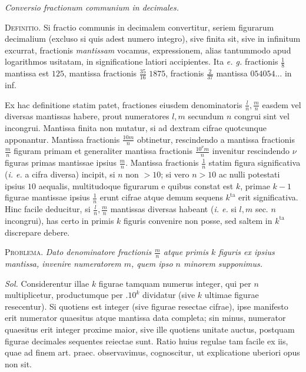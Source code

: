 \begin{center}\textit{Conversio fractionum communium in decimales.}\end{center}

\textsc{Definitio.} Si fractio communis in decimalem convertitur, seriem figurarum decimalium  (excluso si quis adest numero integro), sive finita sit, sive in infinitum excurrat, fractionis \textit{mantissam} vocamus, expressionem, alias tantummodo apud logarithmos usitatam, in significatione latiori accipientes. Ita \textit{e. g.} fractionis \(\frac18\) mantissa est \(125\), mantissa fractionis \(\frac{35}{16}\) \(1875\), fractionis \(\frac2{37}\) mantissa \(054054\ldots\) in inf.

Ex hac definitione statim patet, fractiones eiusdem denominatoris \(\frac ln,\frac mn\) easdem vel diversas mantissas habere, prout numeratores \(l,m\) secundum \(n\) congrui sint vel incongrui. Mantissa finita non mutatur, si ad dextram cifrae quotcunque apponantur. Mantissa fractionis \(\frac{10m}{n}\) obtinetur, rescindendo a mantissa fractionis \(\frac mn\) figuram primam et generaliter mantissa fractionis \(\frac{10^\nu m}{n}\) invenitur rescindendo \(\nu\) figuras primas mantissae ipsius \(\frac mn\). Mantissa fractionis \(\frac1n\) statim figura significativa (\textit{i. e.} a cifra diversa) incipit, si \(n\) non \(>10\); si vero \(n>10\) ac nulli potestati ipsius \(10\) aequalis, multitudoque figurarum e quibus constat est \(k\), primae \(k-1\) figurae mantissae ipsius \(\frac1n\) erunt cifrae atque demum sequens \(k^{\mathrm{ta}}\) erit significativa. Hinc facile deducitur, si \(\frac ln,\frac mn\) mantissas diversas habeant (\textit{i. e.}
si \(l,m\) sec. \(n\) incongrui), has certo in primis \(k\) figuris convenire non posse, sed saltem in \(k^{\mathrm{ta}}\) discrepare debere.

\textsc{Problema.} \textit{Dato denominatore fractionis \(\frac mn\) atque primis \(k\) figuris ex ipsius mantissa, invenire numeratorem \(m\), quem ipso \(n\) minorem supponimus.}

\textit{Sol.} Considerentur illae \(k\) figurae tamquam numerus integer, qui per \(n\) multiplicetur, productumque per \(.10^k\) dividatur (sive \(k\) ultimae figurae resecentur). Si quotiens est integer (sive figurae resectae cifrae), ipse manifesto erit numerator quaesitus atque mantissa data completa; sin minus, numerator quaesitus erit integer proxime maior, sive ille quotiens unitate auctus, postquam figurae decimales sequentes reiectae sunt. Ratio huius regulae tam facile ex iis, quae ad finem art. praec. observavimus, cognoscitur, ut explicatione uberiori opus non sit.

